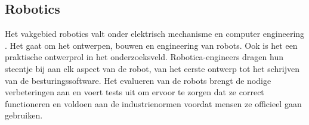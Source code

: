 \subsection{Robotics}
Het vakgebied robotics valt onder elektrisch mechanisme en computer engineering \autocite{Coursera2023}. Het gaat om het ontwerpen, bouwen en engineering van robots. Ook is het een praktische ontwerprol in het onderzoeksveld. Robotica-engineers dragen hun steentje bij aan elk aspect van de robot, van het eerste ontwerp tot het schrijven van de besturingssoftware. Het evalueren van de robots brengt de nodige verbeteringen aan en voert tests uit om ervoor te zorgen dat ze correct functioneren en voldoen aan de industrienormen voordat mensen ze officieel gaan gebruiken. 

